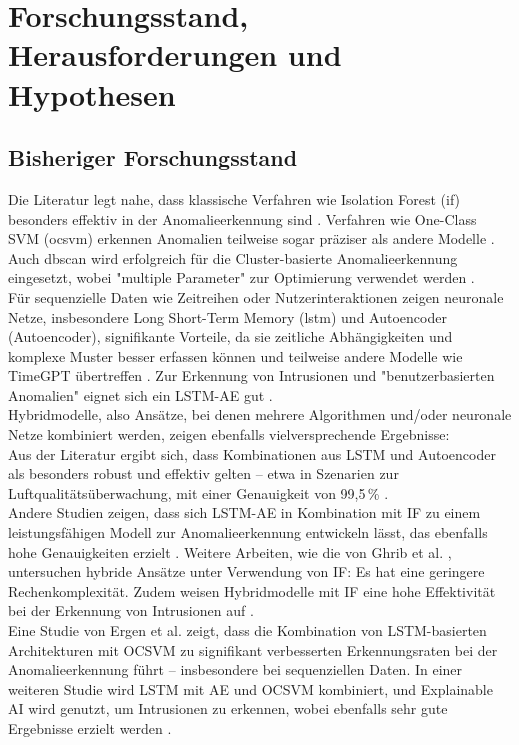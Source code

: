 \documentclass[a4paper,12pt]{article}
\begin{document}
	\section{Forschungsstand, Herausforderungen und Hypothesen}
	\subsection{Bisheriger Forschungsstand}
	Die Literatur legt nahe, dass klassische Verfahren wie Isolation Forest (\gls{if}) besonders effektiv in der Anomalieerkennung sind \cite{yan2021extended}. Verfahren wie One-Class SVM (\gls{ocsvm}) erkennen Anomalien teilweise sogar präziser als andere Modelle \cite{arjunan2024comparative}. Auch \gls{dbscan} wird erfolgreich für die Cluster-basierte Anomalieerkennung eingesetzt, wobei "multiple Parameter" zur Optimierung verwendet werden \cite{thang2011dbscan}. 
	\\[0.5em]
	Für sequenzielle Daten wie Zeitreihen oder Nutzerinteraktionen zeigen neuronale Netze, insbesondere Long Short-Term Memory (\gls{lstm}) und Autoencoder (\gls{Autoencoder}), signifikante Vorteile, da sie zeitliche Abhängigkeiten und komplexe Muster besser erfassen können und teilweise andere Modelle wie TimeGPT übertreffen \cite{demir2024comparative}. Zur Erkennung von Intrusionen und "benutzerbasierten Anomalien" eignet sich ein LSTM-AE gut \cite{Iseed2025}.
	\\[0.5em]
	Hybridmodelle, also Ansätze, bei denen mehrere Algorithmen und/oder neuronale Netze kombiniert werden, zeigen ebenfalls vielversprechende Ergebnisse:
	\\[0.5em]
	Aus der Literatur ergibt sich, dass Kombinationen aus LSTM und Autoencoder als besonders robust und effektiv gelten – etwa in Szenarien zur Luftqualitätsüberwachung, mit einer Genauigkeit von 99,5\,\% \cite{wei2023lstm}.
	\\[0.5em]
	Andere Studien zeigen, dass sich LSTM-AE in Kombination mit IF zu einem leistungsfähigen Modell zur Anomalieerkennung entwickeln lässt, das ebenfalls hohe Genauigkeiten erzielt \cite{tran2020lstm_if}. Weitere Arbeiten, wie die von Ghrib et al. \cite{ghrib2020hybrid}, untersuchen hybride Ansätze unter Verwendung von IF: Es hat eine geringere Rechenkomplexität. Zudem weisen Hybridmodelle mit IF eine hohe Effektivität bei der Erkennung von Intrusionen auf \cite{marteau2017hif}.
	\\[0.5em]
	Eine Studie von Ergen et al. \cite{ergen2017unsupervised} zeigt, dass die Kombination von LSTM-basierten Architekturen mit OCSVM zu signifikant verbesserten Erkennungsraten bei der Anomalieerkennung führt – insbesondere bei sequenziellen Daten. In einer weiteren Studie wird LSTM mit AE und OCSVM kombiniert, und Explainable AI wird genutzt, um Intrusionen zu erkennen, wobei ebenfalls sehr gute Ergebnisse erzielt werden \cite{ha2022explainable}.
\end{document}
